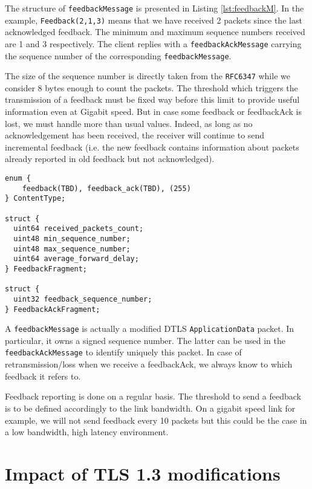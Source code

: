 The structure of \texttt{feedbackMessage} is presented in Listing \ref{lst:feedbackM}. In the example, \texttt{Feedback(2,1,3)} means that we have received 2 packets since the last acknowledged feedback. The minimum and maximum sequence numbers received are 1 and 3 respectively. The client replies with a \texttt{feedbackAckMessage} carrying the sequence number of the corresponding \texttt{feedbackMessage}.

The size of the sequence number is directly taken from the \texttt{RFC6347}\cite{rfc6347} while we consider 8 bytes enough to count the packets. The threshold which triggers the transmission of a feedback must be fixed way before this limit to provide useful information even at Gigabit speed. But in case some feedback or feedbackAck is lost, we must handle more than usual values. Indeed, as long as no acknowledgement has been received, the receiver will continue to send incremental feedback (i.e. the new feedback contains information about packets already reported in old feedback but not acknowledged).



\begin{lstlisting}[caption= Feedback and Feedback Ack messages, label=lst:feedbackM]
enum {
    feedback(TBD), feedback_ack(TBD), (255)
} ContentType;

struct {
  uint64 received_packets_count;
  uint48 min_sequence_number;
  uint48 max_sequence_number;
  uint64 average_forward_delay;
} FeedbackFragment;

struct {
  uint32 feedback_sequence_number;
} FeedbackAckFragment;
\end{lstlisting}

A \texttt{feedbackMessage} is actually a modified DTLS \texttt{ApplicationData} packet. In particular, it owns a signed sequence number. The latter can be used in the \texttt{feedbackAckMessage} to identify uniquely this packet. In case of retransmission/loss when we receive a feedbackAck, we always know to which feedback it refers to.

Feedback reporting is done on a regular basis. The threshold to send a feedback is to be defined accordingly to the link bandwidth. On a gigabit speed link for example, we will not send feedback every 10 packets but this could be the case in a low bandwidth, high latency environment.

\section{Impact of TLS 1.3 modifications}\label{sec:tls13impact}

